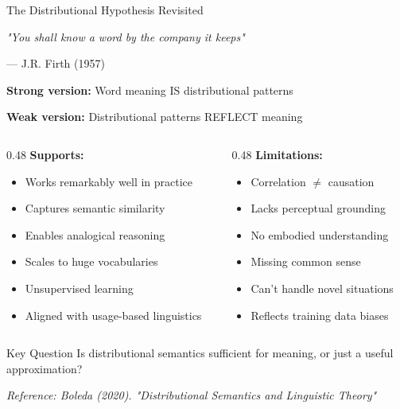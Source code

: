 \documentclass[aspectratio=169]{beamer}
\begin{document}
\begin{frame}[shrink=10]{The Distributional Hypothesis Revisited 📖}
\begin{center}
\huge
\textit{"You shall know a word by the company it keeps"}
\end{center}

\begin{center}
--- J.R. Firth (1957)
\end{center}

\vspace{1em}

\textbf{Strong version:} Word meaning IS distributional patterns

\textbf{Weak version:} Distributional patterns REFLECT meaning

\vspace{1em}

\begin{columns}[T]
\begin{column}{0.48\textwidth}
\textbf{Supports:}
\begin{itemize}\setlength{\itemsep}{0pt}
    \item Works remarkably well in practice
    \item Captures semantic similarity
    \item Enables analogical reasoning
    \item Scales to huge vocabularies
    \item Unsupervised learning
    \item Aligned with usage-based linguistics
\end{itemize}
\end{column}

\begin{column}{0.48\textwidth}
\textbf{Limitations:}
\begin{itemize}\setlength{\itemsep}{0pt}
    \item Correlation $\neq$ causation
    \item Lacks perceptual grounding
    \item No embodied understanding
    \item Missing common sense
    \item Can't handle novel situations
    \item Reflects training data biases
\end{itemize}
\end{column}
\end{columns}

\vspace{1em}

\begin{alertblock}{Key Question}
Is distributional semantics sufficient for meaning, or just a useful approximation?
\end{alertblock}

\small
\textit{Reference: Boleda (2020). "Distributional Semantics and Linguistic Theory"}
\end{frame}
\end{document}
